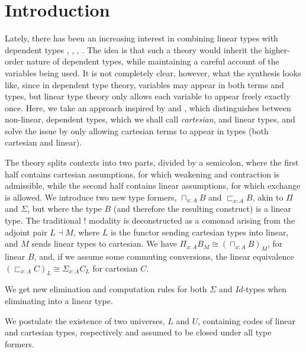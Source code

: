 \section{Introduction}
Lately, there has been an increasing interest in combining linear types with dependent types  \cite{schreiber2014quantization}, \cite{krishnaswami}, \cite{vakar14}, \cite{nothing}. The idea is that such a theory would inherit the higher-order nature of dependent types, while maintaining a careful account of the variables being used. It is not completely clear, however, what the synthesis looks like, since in dependent type theory, variables may appear in both terms and types, but linear type theory only allows each variable to appear freely exactly once. Here, we take an approach inspired by \cite{krishnaswami} and \cite{vakar14}, which distinguishes between non-linear, dependent types, which we shall call \textit{cartesian}, and linear types, and solve the issue by only allowing cartesian terms to appear in types (both cartesian and linear).

The theory splits contexts into two parts, divided by a semicolon, where the first half contains cartesian assumptions, for which weakening and contraction is admissible, while the second half contains linear assumptions, for which exchange is allowed. We introduce two new type formers, $\sqcap_{x : A}B$ and $\sqsubset_{x : A}B$, akin to $\Pi$ and $\Sigma$, but where the type $B$ (and therefore the resulting construct) is a linear type. The traditional $!$ modality is deconstructed as a comonad arising from the adjoint pair $L \dashv M$, where $L$ is the functor sending cartesian types into linear, and $M$ sends linear types to cartesian. We have $\Pi_{x : A}B_M \cong (\sqcap_{x :A}B)_M$, for linear $B$, and, if we assume some commuting conversions, the linear equivalence $(\sqsubset_{x :A}C)_L \cong \Sigma_{x :A}C_L$ for cartesian $C$.

We get new elimination and computation rules for both $\Sigma$ and $Id$-types when eliminating into a linear type. 

We postulate the existence of two universes, $L$ and $U$, containing codes of linear and cartesian types, respectively and assumed to be closed under all type formers.

